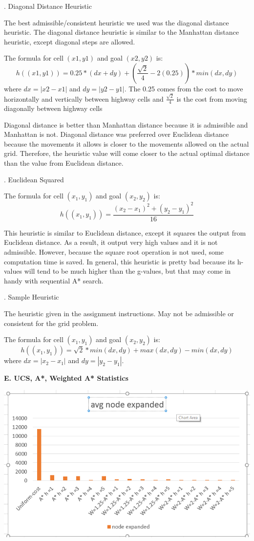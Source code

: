 \documentclass[12pt, letterpaper]{article}
\begin{document}
\bigskip
{}. Diagonal Distance Heuristic

The best admissible/consistent heuristic we used was the diagonal distance heuristic. The diagonal distance heuristic is similar to the Manhattan distance heuristic, except diagonal steps are allowed. 

The formula for cell $(x1,y1)$ and goal $(x2, y2)$ is:
$$h((x1, y1)) = 0.25 * (dx + dy) +  (\frac{\sqrt{2}}{4} - 2(0.25)) * min(dx, dy)$$
where $dx = |x2 - x1|$ and $dy = |y2 - y1|$. The 0.25 comes from the cost to move horizontally and vertically between highway cells and $\frac{\sqrt{2}}{4}$ is the cost from moving diagonally between highway cells

Diagonal distance is better than Manhattan distance because it is admissible and Manhattan is not. Diagonal distance was preferred over Euclidean distance because the movements it allows is closer to the movements allowed on the actual grid. Therefore, the heuristic value will come closer to the actual optimal distance than the value from Euclidean distance.

\bigskip
{}. Euclidean Squared

The formula for cell $(x_1, y_1)$ and goal $(x_2, y_2)$ is:
$$h((x_1,y_1)) = \frac{(x_2-x_1)^2 + (y_2-y_1)^2}{16}$$

This heuristic is similar to Euclidean distance, except it squares the output from Euclidean distance. As a result, it output very high values and it is not admissible. However, because the square root operation is not used, some computation time is saved. In general, this heuristic is pretty bad because its h-values will tend to be much higher than the g-values, but that may come in handy with sequential A* search.

\bigskip
{}. Sample Heuristic

The heuristic given in the assignment instructions. May not be admissible or consistent for the grid problem. 

The formula for cell $(x_1, y_1)$ and goal $(x_2, y_2)$ is:
$$h((x_1,y_1)) = \sqrt{2} * min(dx, dy) + max(dx, dy) - min(dx, dy)$$
where $dx = |x_2 - x_1|$ and $dy = |y_2 - y_1|$. 

\pagebreak %

\noindent \textbf{E. UCS, A*, Weighted A* Statistics}

\noindent \includegraphics[scale=0.6]{"avg-nodeexpanded"}
\end{document}
